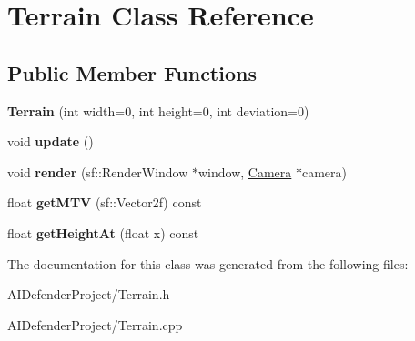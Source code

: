 \hypertarget{class_terrain}{}\section{Terrain Class Reference}
\label{class_terrain}
\subsection*{Public Member Functions}
\begin{DoxyCompactItemize}
\item 
\mbox{\label{class_terrain_a0c45b2b3c9c47610e74fe9b4c429eb7e}} 
{\bfseries Terrain} (int width=0, int height=0, int deviation=0)
\item 
\mbox{\label{class_terrain_a6058f18db9230e291de22473cb6413a3}} 
void {\bfseries update} ()
\item 
\mbox{\label{class_terrain_abb822792475217c37e342b8dbd8e9f8d}} 
void {\bfseries render} (sf\+::\+Render\+Window $\ast$window, \hyperlink{class_camera}{Camera} $\ast$camera)
\item 
\mbox{\label{class_terrain_aa0079612e37f31e2b3cba9f4de36c255}} 
float {\bfseries get\+M\+TV} (sf\+::\+Vector2f) const
\item 
\mbox{\label{class_terrain_a55305fd05a936176147512200921372a}} 
float {\bfseries get\+Height\+At} (float x) const
\end{DoxyCompactItemize}


The documentation for this class was generated from the following files\+:\begin{DoxyCompactItemize}
\item 
A\+I\+Defender\+Project/Terrain.\+h\item 
A\+I\+Defender\+Project/Terrain.\+cpp\end{DoxyCompactItemize}
